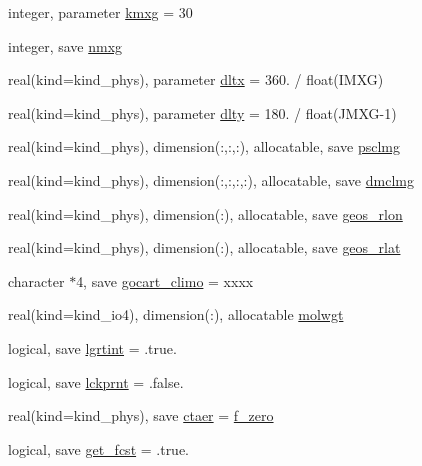 \begin{DoxyCompactItemize}
\item 
integer, parameter \hyperlink{group__module__radiation__aerosols_ga5339e589d92fab8cbb310b84b6ca3d9e}{kmxg} = 30
\item 
integer, save \hyperlink{group__module__radiation__aerosols_gadb4c4cdc8e3212777229d1f54e79bb05}{nmxg}
\item 
real(kind=kind\+\_\+phys), parameter \hyperlink{group__module__radiation__aerosols_ga084315fde4afcad23cd3aeb18a4d8a4e}{dltx} = 360. / float(I\+M\+XG)
\item 
real(kind=kind\+\_\+phys), parameter \hyperlink{group__module__radiation__aerosols_ga499bb3c75e9802c5ee7fd6cdb6660f7e}{dlty} = 180. / float(J\+M\+XG-\/1)
\item 
real(kind=kind\+\_\+phys), dimension(\+:,\+:,\+:), allocatable, save \hyperlink{group__module__radiation__aerosols_ga942aa3a9f61cb40592bd0879a91c2ede}{psclmg}
\item 
real(kind=kind\+\_\+phys), dimension(\+:,\+:,\+:,\+:), allocatable, save \hyperlink{group__module__radiation__aerosols_ga123d552c7f98f7371565f4e2017efd45}{dmclmg}
\item 
real(kind=kind\+\_\+phys), dimension(\+:), allocatable, save \hyperlink{group__module__radiation__aerosols_ga1a0e35ab33517e765898870b8b1ab1ad}{geos\+\_\+rlon}
\item 
real(kind=kind\+\_\+phys), dimension(\+:), allocatable, save \hyperlink{group__module__radiation__aerosols_gaef43bfbd28ef9b87e8d6973ba7331a18}{geos\+\_\+rlat}
\item 
character $\ast$4, save \hyperlink{group__module__radiation__aerosols_gab8118108e60a4795a8caa5af71232399}{gocart\+\_\+climo} = \textquotesingle{}xxxx\textquotesingle{}
\item 
real(kind=kind\+\_\+io4), dimension(\+:), allocatable \hyperlink{group__module__radiation__aerosols_ga166e63abaa518ec795f8eea6d115f03c}{molwgt}
\item 
logical, save \hyperlink{group__module__radiation__aerosols_gaa27bf6912bfd67b78381892d4f555c51}{lgrtint} = .true.
\item 
logical, save \hyperlink{group__module__radiation__aerosols_ga018d5414597049069c1ddd1094285371}{lckprnt} = .false.
\item 
real(kind=kind\+\_\+phys), save \hyperlink{group__module__radiation__aerosols_ga4b0aa142aee31c40361dadc390ccc68e}{ctaer} = \hyperlink{group__module__radiation__aerosols_ga7db1adcf476a9a5532230aa11fcc3bb7}{f\+\_\+zero}
\item 
logical, save \hyperlink{group__module__radiation__aerosols_ga36f851e49de5e1f7da38da5fa6ea445c}{get\+\_\+fcst} = .true.

\end{DoxyCompactItemize}
